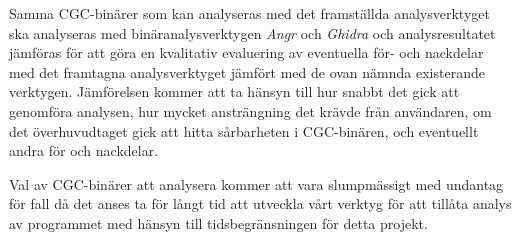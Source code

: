 Samma CGC-binärer som kan analyseras med det framställda analysverktyget ska
analyseras med binäranalysverktygen \emph{Angr} och \emph{Ghidra} och
analysresultatet jämföras för att göra en kvalitativ evaluering av eventuella
för- och nackdelar med det framtagna analysverktyget jämfört med de ovan nämnda
existerande verktygen. Jämförelsen kommer att ta hänsyn till hur snabbt det
gick att genomföra analysen, hur mycket ansträngning det krävde från
användaren, om det överhuvudtaget gick att hitta sårbarheten i CGC-binären, och
eventuellt andra för och nackdelar.

Val av CGC-binärer att analysera kommer att vara slumpmässigt med undantag för
fall då det anses ta för långt tid att utveckla vårt verktyg för att tillåta
analys av programmet med hänsyn till tidsbegränsningen för detta projekt.
